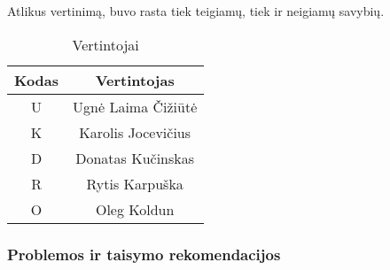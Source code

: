 	Atlikus vertinimą, buvo rasta tiek teigiamų, tiek ir neigiamų savybių.
	
		\begin{table}[ht] 
		\caption{Vertintojai} %
		\centering %
			\begin{tabular}{c c} %
		\hline\hline %
		Kodas & Vertintojas\\ [0.5ex] %
		\hline %
		U & Ugnė Laima Čižiūtė \\
		K & Karolis Jocevičius \\
		D & Donatas Kučinskas \\
		R & Rytis Karpuška \\
		O & Oleg Koldun \\
		\hline %
		\end{tabular} 
		\label{table:legenda} %
		\end{table} 
		
	\subsubsection{Problemos ir taisymo rekomendacijos}
	
